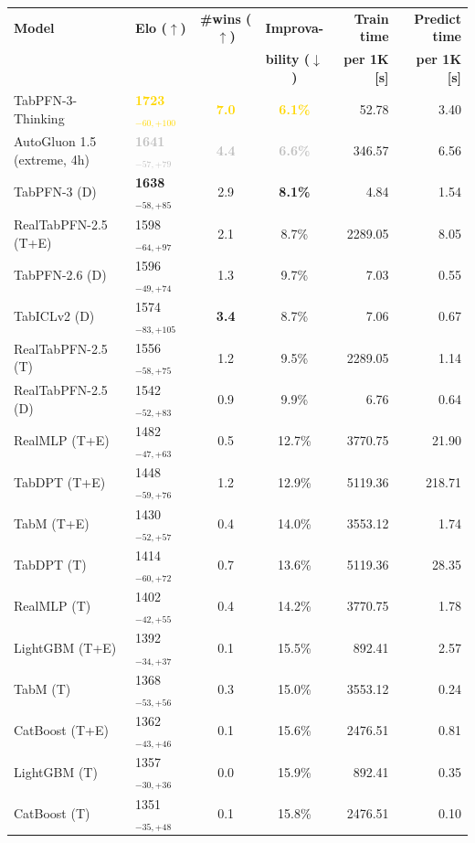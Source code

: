 \begin{tabular}{llccrr}
\toprule
\textbf{Model} & \textbf{Elo ($\uparrow$)} & \textbf{\#wins ($\uparrow$)} & \textbf{Improva-} & \textbf{Train time} & \textbf{Predict time} \\
 &  &  & \textbf{bility ($\downarrow$)} & \textbf{per 1K [s]} & \textbf{per 1K [s]} \\
\midrule
TabPFN-3-Thinking & \textcolor{gold}{\textbf{1723${}_{-60,+100}$}} & \textcolor{gold}{\textbf{7.0}} & \textcolor{gold}{\textbf{6.1\%}} & 52.78 & 3.40 \\
AutoGluon 1.5 (extreme, 4h) & \textcolor{silver}{\textbf{1641${}_{-57,+79}$}} & \textcolor{silver}{\textbf{4.4}} & \textcolor{silver}{\textbf{6.6\%}} & 346.57 & 6.56 \\
TabPFN-3 (D) & \textcolor{bronze}{\textbf{1638${}_{-58,+85}$}} & 2.9 & \textcolor{bronze}{\textbf{8.1\%}} & 4.84 & 1.54 \\
RealTabPFN-2.5 (T+E) & 1598${}_{-64,+97}$ & 2.1 & 8.7\% & 2289.05 & 8.05 \\
TabPFN-2.6 (D) & 1596${}_{-49,+74}$ & 1.3 & 9.7\% & 7.03 & 0.55 \\
TabICLv2 (D) & 1574${}_{-83,+105}$ & \textcolor{bronze}{\textbf{3.4}} & 8.7\% & 7.06 & 0.67 \\
RealTabPFN-2.5 (T) & 1556${}_{-58,+75}$ & 1.2 & 9.5\% & 2289.05 & 1.14 \\
RealTabPFN-2.5 (D) & 1542${}_{-52,+83}$ & 0.9 & 9.9\% & 6.76 & 0.64 \\
RealMLP (T+E) & 1482${}_{-47,+63}$ & 0.5 & 12.7\% & 3770.75 & 21.90 \\
TabDPT (T+E) & 1448${}_{-59,+76}$ & 1.2 & 12.9\% & 5119.36 & 218.71 \\
TabM (T+E) & 1430${}_{-52,+57}$ & 0.4 & 14.0\% & 3553.12 & 1.74 \\
TabDPT (T) & 1414${}_{-60,+72}$ & 0.7 & 13.6\% & 5119.36 & 28.35 \\
RealMLP (T) & 1402${}_{-42,+55}$ & 0.4 & 14.2\% & 3770.75 & 1.78 \\
LightGBM (T+E) & 1392${}_{-34,+37}$ & 0.1 & 15.5\% & 892.41 & 2.57 \\
TabM (T) & 1368${}_{-53,+56}$ & 0.3 & 15.0\% & 3553.12 & 0.24 \\
CatBoost (T+E) & 1362${}_{-43,+46}$ & 0.1 & 15.6\% & 2476.51 & 0.81 \\
LightGBM (T) & 1357${}_{-30,+36}$ & 0.0 & 15.9\% & 892.41 & 0.35 \\
CatBoost (T) & 1351${}_{-35,+48}$ & 0.1 & 15.8\% & 2476.51 & 0.10 \\

\end{tabular}
